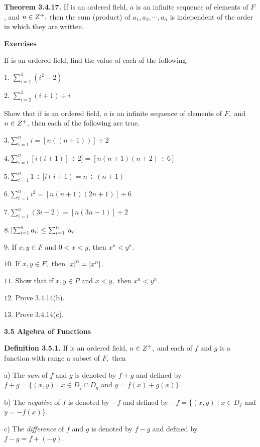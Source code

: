 \begin{large}
\textbf{Theorem 3.4.17.} If \of is an ordered field, $a$ is an infinite sequence of elements of $F$, and $n\in Z^{+},$ then the sum (product) of $a_{1} ,a_{2}, \cdots ,a_{n} $ is independent of the order in which they are written. \nl

\textbf{Exercises}\nl

If \of is an ordered field, find the value of each of the following.\nl

1. $\sum_{i=1}^{4}(i^{2} - 2)$\nl

2. $\sum_{i=2}^{4}(i+1)\div i$\nl

Show that if \of is an ordered field, $a$ is an infinite sequence of elements of $F,$ and $n\in Z^{+} ,$ then each of the following are true.

\newpage
\begin{large}
$3.  \sum_{i=1}^{n} i = [n((n+1))]\div 2$\nl

$4. \sum_{i=1}^{n} [i(i+1)]\div 2] = [n(n + 1)(n + 2)\div 6]$\nl

$5.  \sum_{i=1}^{n} 1\div [i(i + 1) = n\div (n+1)$\nl

$6.   \sum_{i=1}^{n} i^{2} =  [n(n+1)(2n+1)]\div 6 $\nl

$7.   \sum_{i=1}^{n} (3i - 2) = [n(3n - 1)]\div 2 $\nl

$8.   \left|\sum_{i=1}^{n} a_{i}\right| \leq  \sum_{i=1}^{n}\left|a_{i}\right|$\nl

$9.$   If $x,y \in F$ and $0 < x < y$, then $x^{n} < y^{n}.$\nl

$10.$ If $x,y \in F,$ then $\left|x\right|^{n} = \left|x^{n}\right|.$\nl

$11.$ Show that if $x,y\in P$ and $x < y,$ then $x^{n} < y^{n}.$\nl

$12.$ Prove 3.4.14(b).\nl

$13.$ Prove 3.4.14(c).\nl
\end{large}
\vfill
\textbf{3.5 Algebra of Functions}\nl

\textbf{Definition 3.5.1.} If \of is an ordered field, $n\in Z^{+},$ and each of $f$ and $g$ is a function with range a subset of $F,$ then \nl

a) The \textit{sum} of $f$ and $g$ is denoted by $f + g$ and defined by $f +g = \{ (x,y) \mid x\in D_{f}\cap D_{g}$ and $y= f(x) + g(x)\}.$\nl

b) The \textit{negative} of $f$ is denoted by $-f$ and defined by $-f= \{(x,y) \mid x\in D_{f}$ and $y = -f(x)\}$.\nl

c) The \textit{difference} of $f$ and $g$ is denoted by $f - g$ and defined by $f - g = f + (-g).$ \nl


\end{large}
